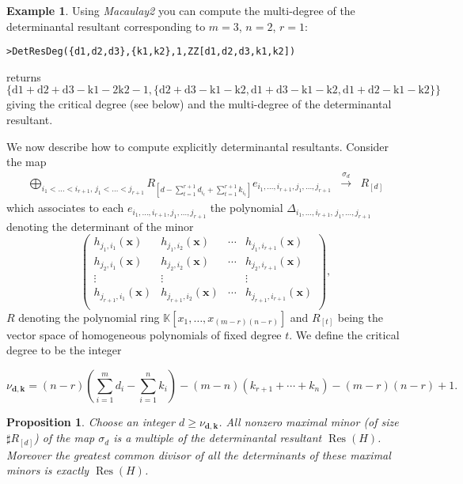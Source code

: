 \documentclass[10pt]{amsart}
\theoremstyle{plain}
\newtheorem{prop}[thm]{Proposition}
\theoremstyle{definition}
\newtheorem{exmp}[thm]{Example}
\def\KK{{\mathbb{K}}}
\def\k{{\mathbf{k}}}
\def\x{\mathbf{x}}
\def\d{{\mathbf{d}}}
\DeclareMathOperator\Res{Res}
\begin{document}
\begin{exmp} Using \textit{Macaulay2} you can compute the multi-degree of the determinantal resultant corresponding to $m=3$, $n=2$, $r=1$:
\begin{verbatim}
>DetResDeg({d1,d2,d3},{k1,k2},1,ZZ[d1,d2,d3,k1,k2])
\end{verbatim}
returns $\{{\text{d1}}+{\text{d2}}+{\text{d3}}-\text{k1}-2 \text{k2}-1,\{{\text{d2}}+{\text{d3}}-\text{k1}-\text{k2},{\text{d1}}+{\text{d3}}-\text{k1}-\text{k2},{\text{d1}}+{\text{d2}}-\text{k1}-\text{k2}\}\}$ giving the critical degree (see below) and the multi-degree of the determinantal resultant. 
\end{exmp}


We now describe how to compute explicitly determinantal resultants.  
Consider the map 
$$\begin{array}{ccl}
  \bigoplus_{i_1<\ldots < i_{r+1},\, j_1<\ldots <j_{r+1}}
  R_{[d-\sum_{t=1}^{r+1}d_{i_t}+\sum_{t=1}^{r+1}k_{i_t}]}e_{i_1,\ldots ,i_{r+1},j_1,\ldots ,j_{r+1}} &
  \xrightarrow{\sigma_{d}} & R_{[d]} 
\end{array}$$
which associates to each $e_{i_1,\ldots, i_{r+1},j_1,\ldots ,j_{r+1}}$
the polynomial $\Delta_{i_1,\ldots ,i_{r+1},\, j_1,\ldots ,j_{r+1}}$ 
 denoting the determinant of the minor 
$$\left( \begin{array}{cccc}
    h_{j_1,i_1}(\x) & h_{j_1,i_2}(\x) & \cdots & h_{j_1,i_{r+1}}(\x) \\
    h_{j_2,i_1}(\x) & h_{j_2,i_2}(\x) & \cdots & h_{j_2,i_{r+1}}(\x) \\
    \vdots & \vdots & & \vdots \\
    h_{j_{r+1},i_1}(\x) & h_{j_{r+1},i_2}(\x) & \cdots & h_{j_{r+1},i_{r+1}}(\x)\\
  \end{array} \right),$$
$R$ denoting the polynomial ring $\KK[x_1,\ldots,x_{(m-r)(n-r)}]$ and 
$R_{[t]}$ being the vector space of homogeneous polynomials of fixed
degree $t$. We define the critical degree to be the integer

$$\nu_{\d,\k}=(n-r)(\sum_{i=1}^m d_i - \sum_{i=1}^n k_i) -
 (m-n)(k_{r+1}+\cdots+k_n) - (m-r)(n-r)+1.$$

\begin{prop} Choose an integer $d\geq \nu_{\d,\k}$. All nonzero maximal
  minor (of size $\sharp R_{[d]}$) of the map $\sigma_{d}$ is a  
 multiple of the determinantal resultant $\Res(H)$. 
  Moreover the greatest common divisor of all the determinants of
  these maximal minors is exactly $\Res(H)$.
\end{prop}
\end{document}
